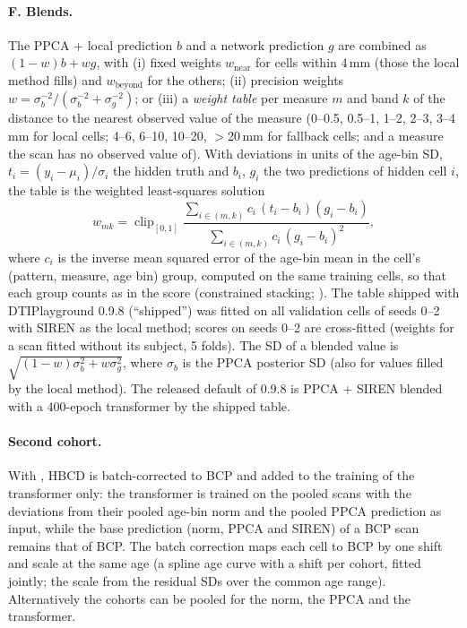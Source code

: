\documentclass[11pt]{article}
\begin{document}
\paragraph{F. Blends.} The PPCA + local prediction $b$ and a network prediction $g$ are combined as $(1-w)b+wg$, with
(i) fixed weights $w_{\text{near}}$ for cells within 4\,mm (those the local method fills) and $w_{\text{beyond}}$ for the
others; (ii) precision weights $w=\sigma_b^{-2}/(\sigma_b^{-2}+\sigma_g^{-2})$; or (iii) a \emph{weight table} per measure
$m$ and band $k$ of the distance to the nearest observed value of the measure (0--0.5, 0.5--1, 1--2, 2--3, 3--4\,mm for
local cells; 4--6, 6--10, 10--20, $>$20\,mm for fallback cells; and a measure the scan has no observed value of). With
deviations in units of the age-bin SD, $t_i=(y_i-\mu_i)/\sigma_i$ the hidden truth and $b_i$, $g_i$ the two predictions
of hidden cell $i$, the table is the weighted least-squares solution
\begin{equation}
w_{mk}=\operatorname{clip}_{[0,1]}\frac{\sum_{i\in(m,k)}c_i\,(t_i-b_i)(g_i-b_i)}{\sum_{i\in(m,k)}c_i\,(g_i-b_i)^2},
\end{equation}
where $c_i$ is the inverse mean squared error of the age-bin mean in the cell's (pattern, measure, age bin) group,
computed on the same training cells, so that each group counts as in the score (constrained stacking;
\citealp{wolpert1992stacked,breiman1996stacked}). The table shipped with DTIPlayground 0.9.8 (``shipped'') was fitted
on all validation cells of seeds 0--2 with SIREN as the local method; scores on seeds 0--2 are cross-fitted (weights
for a scan fitted without its subject, 5 folds). The SD of a blended value is $\sqrt{(1-w)\sigma_b^2+w\sigma_g^2}$, where
$\sigma_b$ is the PPCA posterior SD (also for values filled by the local method). The released default of 0.9.8 is
PPCA + SIREN blended with a 400-epoch transformer by the shipped table.

\paragraph{Second cohort.} With , HBCD is batch-corrected to BCP and added to the
training of the transformer only: the transformer is trained on the pooled scans with the deviations from their pooled
age-bin norm and the pooled PPCA prediction as input, while the base prediction (norm, PPCA and SIREN) of a BCP scan
remains that of BCP. The batch correction maps each cell to BCP by one shift and scale at the same age (a spline age
curve with a shift per cohort, fitted jointly; the scale from the residual SDs over the common age range).
Alternatively the cohorts can be pooled for the norm, the PPCA and the transformer.
\end{document}

